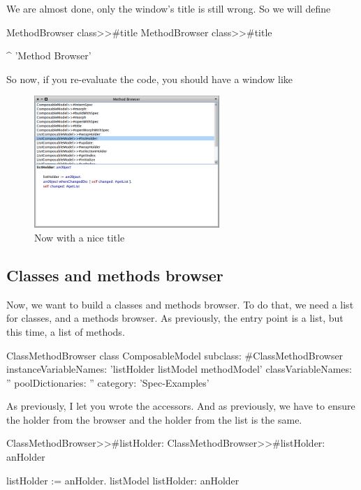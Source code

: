 \documentclass[a4paper,10pt,twoside]{book}
\begin{document}
We are almost done, only the window's title is still wrong.
So we will define
\begin{method}{MethodBrowser class>>\#title}
MethodBrowser class>>#title

	^ 'Method Browser'
\end{method}

So now, if you re-evaluate the code, you should have a window like 

\begin{figure}[ht]
\begin{center}
	\includegraphics[width=7cm]{MethodBrowser4}
	\caption{Now with a nice title}
\end{center}
\end{figure}

\subsection{Classes and methods browser}

Now, we want to build a classes and methods browser. To do that, we need a list for classes, and a methods browser. As previously, the entry point is a list, but this time, a list of methods.

\begin{classdef}{ClassMethodBrowser class}
ComposableModel subclass: #ClassMethodBrowser
	instanceVariableNames: 'listHolder listModel methodModel'
	classVariableNames: ''
	poolDictionaries: ''
	category: 'Spec-Examples'
\end{classdef}

As previously, I let you wrote the accessors. And as previously, we have to ensure the holder from the browser and the holder from the list is the same.

\begin{method}{ClassMethodBrowser>>\#listHolder:}
ClassMethodBrowser>>#listHolder: anHolder
	
	listHolder := anHolder.
	listModel listHolder: anHolder
\end{method}
\end{document}
